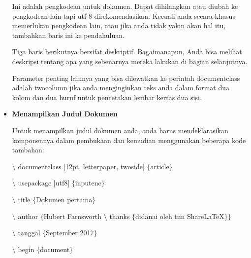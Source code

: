 \begin{itemize}
\hspace*{0.5in}Ini adalah pengkodean untuk dokumen. Dapat dihilangkan atau diubah ke pengkodean lain tapi utf-8 direkomendasikan. Kecuali anda secara khusus memerlukan pengkodean lain, atau jika anda tidak yakin akan hal itu, tambahkan baris ini ke pendahuluan.\par
\vspace{\baselineskip}
Tiga baris berikutnya bersifat deskriptif. Bagaimanapun, Anda bisa melihat deskripsi tentang apa yang sebenarnya mereka lakukan di bagian selanjutnya.\par
\vspace{\baselineskip}
Parameter penting lainnya yang bisa dilewatkan ke perintah documentclass adalah twocolumn jika anda menginginkan teks anda dalam format dua kolom dan dua huruf untuk pencetakan lembar kertas dua sisi.\par
\vspace{\baselineskip}
\vspace{10pt}
	\item {\fontsize{14pt}{14pt}\selectfont \textbf{Menampilkan Judul Dokumen}}\par
\vspace{\baselineskip}
Untuk menampilkan judul dokumen anda, anda harus mendeklarasikan komponennya dalam pembukaan dan kemudian menggunakan beberapa kode tambahan:\par
\vspace{\baselineskip}
\hspace*{0.5in}$\setminus$ documentclass [12pt, letterpaper, twoside] $ \{ $article$ \} $\par

\hspace*{0.5in}$\setminus$ usepackage [utf8] $ \{ $inputenc$ \} $\par

\hspace*{0.5in}$\setminus$ title $ \{ $Dokumen pertama$ \} $\par
\vspace{\baselineskip}
$\setminus$ author $ \{ $Hubert Farnsworth $\setminus$ thanks $ \{ $didanai oleh tim ShareLaTeX$ \} $$ \} $\par
\vspace{\baselineskip}
\hspace*{0.5in}$\setminus$ tanggal $ \{ $September 2017$ \} $\par

\hspace*{0.5in}$\setminus$ begin $ \{ $document$ \} $\par


\end{itemize}

